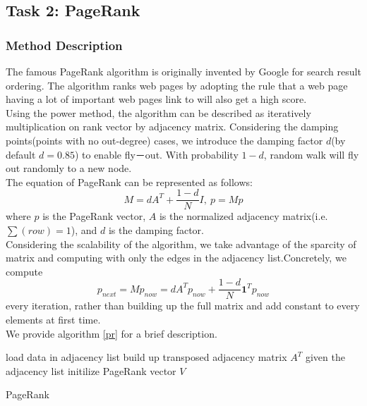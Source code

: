 \subsection{Task 2: PageRank}
\subsubsection{Method Description}
The famous PageRank algorithm is originally invented by Google for search result ordering. The algorithm ranks web pages by adopting the rule that a web page having a lot of important web pages link to will also get a high score. \\
Using the power method, the algorithm can be described as iteratively multiplication on rank vector by adjacency matrix. Considering the damping points(points with no out-degree) cases, we introduce the damping factor $d$(by default \(d=0.85\)) to enable fly－out. With probability \(1-d\), random walk will fly out randomly to a new node.\\
The equation of PageRank can be represented as follows:
\[M=dA^T + \frac{1-d}{N}I,\ p=Mp\]
where $p$ is the PageRank vector, $A$ is the normalized adjacency matrix(i.e. \(\sum(row) = 1\)), and $d$ is the damping factor.\\
Considering the scalability of the algorithm, we take advantage of the sparcity of matrix and computing with only the edges in the adjacency list.Concretely, we compute \[p_{next} = Mp_{now} = dA^Tp_{now} + \frac{1-d}{N}\mathbf{1}^Tp_{now}\] every iteration, rather than building up the full matrix and add constant to every elements at first time. \\
We provide algorithm \ref{pr} for a brief description.
\begin{algorithm}[htbp]
	\SetAlgoLined
	load data in adjacency list\;
	build up transposed adjacency matrix $A^T$ given the adjacency list\;
	initilize PageRank vector $V$\;
	\caption{PageRank}
	\label{pr}
\end{algorithm}

